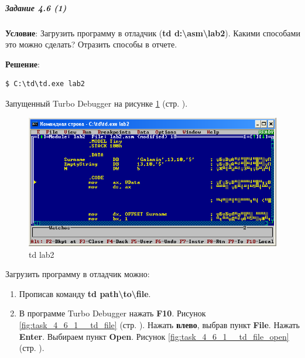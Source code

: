 \subparagraph{Задание 4.6 (1)}

\textbf{Условие}:
Загрузить программу в отладчик (\textbf{td d:\textbackslash\/asm\textbackslash\/lab2}). Какими способами это можно сделать? Отразить способы в отчете.

\textbf{Решение}:

\begin{lstlisting}[language=Terminal]
    $ C:\td\td.exe lab2
\end{lstlisting}

Запущенный Turbo Debugger на рисунке \ref{fig:task_4_6_1__td} (стр. \pageref{fig:task_4_6_1__td}).

\begin{figure}[!htp]
    \centering
    \includegraphics[width=11.2cm]
        {../_INCLUDES/task-4-6-1/td.png}
    \caption{td lab2}
    \label{fig:task_4_6_1__td}
\end{figure}

Загрузить программу в отладчик можно:
\begin{enumerate}
    \item Прописав команду \textbf{td path\textbackslash\/to\textbackslash\/file}.
    \item В программе Turbo Debugger нажать \textbf{F10}. Рисунок \ref{fig:task_4_6_1__td_file} (стр. \pageref{fig:task_4_6_1__td_file}). Нажать \textbf{влево}, выбрав пункт \textbf{File}. Нажать \textbf{Enter}. Выбираем пункт \textbf{Open}. Рисунок \ref{fig:task_4_6_1__td_file_open} (стр. \pageref{fig:task_4_6_1__td_file_open}).
\end{enumerate}

